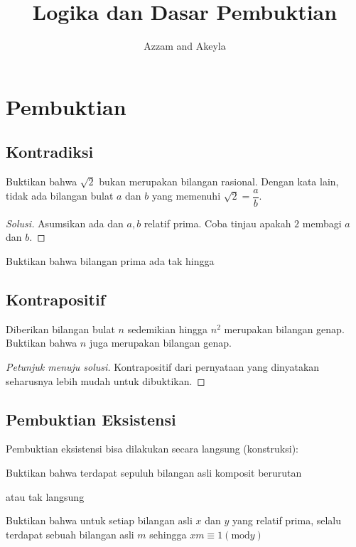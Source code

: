 \documentclass[11pt]{scrartcl}
\title{Logika dan Dasar Pembuktian}
\author{Azzam and Akeyla}
\begin{document}
\maketitle

\renewcommand*\contentsname{Daftar Isi}
\tableofcontents

\newpage
\section{Pembuktian}
\subsection{Kontradiksi}
\begin{example}
    Buktikan bahwa $\sqrt{2}$ bukan merupakan bilangan rasional. Dengan kata lain, tidak ada bilangan bulat $a$ dan $b$ yang memenuhi $\sqrt{2} = \dfrac{a}{b}$.
\end{example}
\begin{proof}[Solusi]
    Asumsikan ada dan $a, b$ relatif prima. Coba tinjau apakah $2$ membagi $a$ dan $b$.
\end{proof}

\begin{example}
    Buktikan bahwa bilangan prima ada tak hingga
\end{example}

\subsection{Kontrapositif}
\begin{example}
    Diberikan bilangan bulat $n$ sedemikian hingga $n^2$ merupakan bilangan genap. Buktikan bahwa $n$ juga merupakan bilangan genap.
\end{example}
\begin{proof}[Petunjuk menuju solusi]
    Kontrapositif dari pernyataan yang dinyatakan seharusnya lebih mudah untuk dibuktikan. 
\end{proof}

\subsection{Pembuktian Eksistensi}
Pembuktian eksistensi bisa dilakukan secara langsung (konstruksi):
\begin{example}
    Buktikan bahwa terdapat sepuluh bilangan asli komposit berurutan
\end{example}
atau tak langsung
\begin{example}
    Buktikan bahwa untuk setiap bilangan asli $x$ dan $y$ yang relatif prima, selalu terdapat sebuah bilangan asli $m$ sehingga $xm \equiv 1 (\text{mod} y)$
\end{example}
\end{document}
